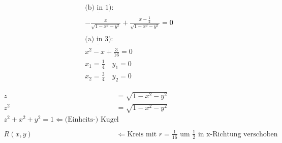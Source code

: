 \begin{align*}
    \underline{\text{(b) in } 1)}: \\
    - \frac{x}{\sqrt{1 - x^2 - y^2}} + \frac{x - \frac{1}{2}}{\sqrt{1 - x^2 - y^2}} = 0 \\ %
    \\
    \underline{\text{(a) in } 3)}: \\
    x^2 - x + \frac{3}{16} = 0 \\
    x_1 = \frac{1}{4} \quad y_1 = 0 \\
    x_2 = \frac{3}{4} \quad y_2 = 0
\end{align*}

\begin{align*}
    z &= \sqrt{1 - x^2 - y^2} \\
    z^2 &= \sqrt{1 - x^2 - y^2} \\
    z^2 + x^2 + y^2 = 1 \Leftarrow \text{(Einheits-) Kugel} \\
    \\
    R(x,y) &\Leftarrow \text{Kreis mit } r = \frac{1}{16} \text{ um } \frac{1}{2} \text{ in x-Richtung verschoben} 
\end{align*}

